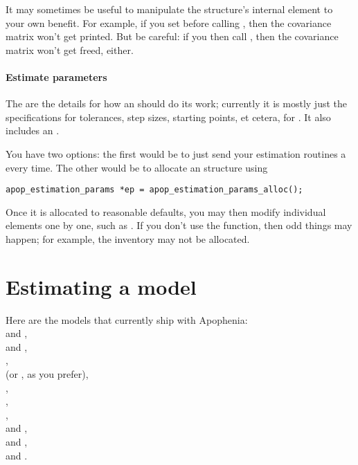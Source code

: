 It may sometimes be useful to manipulate the  structure's
internal  element to your own benefit. For
example, if you set  before calling
, then the covariance matrix won't get
printed. But be careful: if you then call ,
then the covariance matrix won't get freed, either.

\paragraph{Estimate parameters}
The  are the details for how an  should do its work; currently it is mostly just the specifications
for tolerances, step sizes, starting points, et cetera, for . It also includes an .  

You have two options: the first would be to just send your estimation
routines a  every time. The other would be to allocate an
 structure using 
\begin{lstlisting}
apop_estimation_params *ep = apop_estimation_params_alloc();
\end{lstlisting}
Once it is allocated to reasonable defaults, you may then modify
individual elements one by one, such as .
If you don't use the  function,
then odd things may happen; for example, the inventory may not be
allocated.

\section{Estimating a model}
 
 
 
 
 
Here are the models that currently ship with Apophenia:\\
 and , \\
 and , \\
, \\
 (or , as you prefer), \\
, \\
, \\
, \\
 and , \\
 and , \\
 and .

